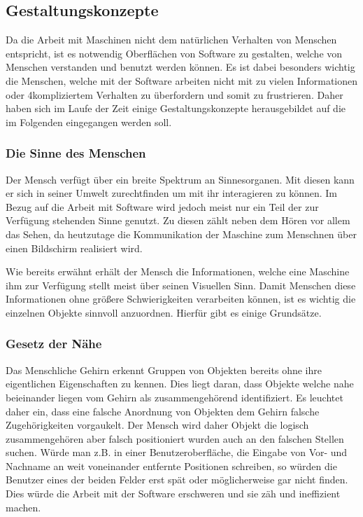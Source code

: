 \subsection{Gestaltungskonzepte}
Da die Arbeit mit Maschinen nicht dem natürlichen Verhalten von Menschen entspricht, 
ist es notwendig Oberflächen von Software zu gestalten, welche von Menschen verstanden und benutzt werden können. 
Es ist dabei besonders wichtig die Menschen, welche mit der Software arbeiten
nicht mit zu vielen Informationen oder 4kompliziertem Verhalten zu überfordern und somit zu frustrieren.
Daher haben sich im Laufe der Zeit einige Gestaltungskonzepte herausgebildet auf die im Folgenden eingegangen werden soll. 

\subsubsection{Die Sinne des Menschen}

Der Mensch verfügt über ein breite Spektrum an Sinnesorganen. Mit diesen kann er 
sich in seiner Umwelt zurechtfinden um mit ihr interagieren zu können. Im Bezug auf die 
Arbeit mit Software wird jedoch meist nur ein Teil der zur Verfügung stehenden Sinne genutzt. 
Zu diesen zählt neben dem Hören vor allem das Sehen, da heutzutage die Kommunikation 
der Maschine zum Menschnen über einen Bildschirm realisiert wird. 

Wie bereits erwähnt erhält der Mensch die Informationen, welche eine Maschine ihm 
zur Verfügung stellt meist über seinen Visuellen Sinn. Damit Menschen diese Informationen ohne 
größere Schwierigkeiten verarbeiten können, ist es wichtig die einzelnen Objekte sinnvoll anzuordnen. 
Hierfür gibt es einige Grundsätze.

\subsubsection{Gesetz der Nähe}  

Das Menschliche Gehirn erkennt Gruppen von Objekten bereits ohne ihre eigentlichen Eigenschaften zu kennen. 
Dies liegt daran, dass Objekte welche nahe beieinander liegen vom Gehirn als zusammengehörend identifiziert. 
Es leuchtet daher ein, dass eine falsche Anordnung von Objekten dem Gehirn falsche Zugehörigkeiten vorgaukelt. 
Der Mensch wird daher Objekt die logisch zusammengehören aber falsch positioniert wurden auch an den 
falschen Stellen suchen. Würde man z.B. in einer Benutzeroberfläche, die
Eingabe von Vor- und Nachname an weit voneinander entfernte Positionen
schreiben, so würden die Benutzer eines der beiden Felder erst spät oder
möglicherweise gar nicht finden. Dies würde die Arbeit mit der
Software erschweren und sie zäh und ineffizient machen.

